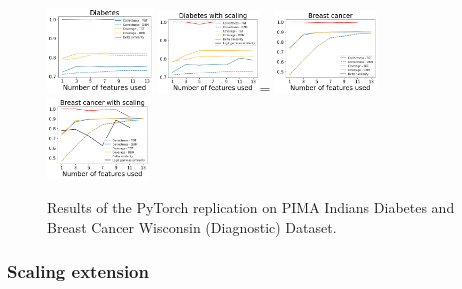 \begin{figure}[H]
    \includegraphics[width=0.25\textwidth]{images/ptfigures/diabetes-tradeoff.png}
    \includegraphics[width=0.24\textwidth]{images/ptfigures/diabetes_scaling-tradeoff.png}=
    \includegraphics[width=0.24\textwidth]{images/ptfigures/breast-tradeoff.png}
    \includegraphics[width=0.24\textwidth]{images/ptfigures/breastscaling-tradeoff.png}
    \caption{Results of the PyTorch replication on PIMA Indians Diabetes and Breast Cancer Wisconsin (Diagnostic) Dataset.}
    \label{fig:pt_diabetes_breast}
\end{figure}

\subsubsection{Scaling extension}

